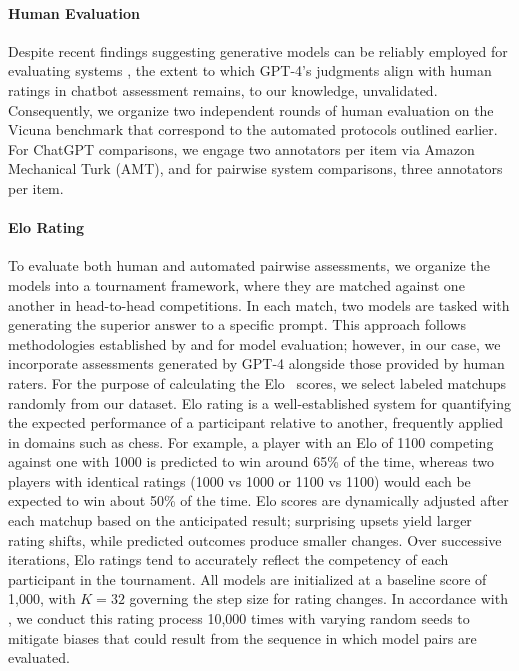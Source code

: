 \paragraph{Human Evaluation} Despite recent findings suggesting generative models can be reliably employed for evaluating systems \citep{fu2023gptscore}, the extent to which GPT-4’s judgments align with human ratings in chatbot assessment remains, to our knowledge, unvalidated. Consequently, we organize two independent rounds of human evaluation on the Vicuna benchmark that correspond to the automated protocols outlined earlier. For ChatGPT comparisons, we engage two annotators per item via Amazon Mechanical Turk (AMT), and for pairwise system comparisons, three annotators per item.

\paragraph{Elo Rating} To evaluate both human and automated pairwise assessments, we organize the models into a tournament framework, where they are matched against one another in head-to-head competitions. In each match, two models are tasked with generating the superior answer to a specific prompt. This approach follows methodologies established by \citet{bai2022training} and \citet{vicuna2023} for model evaluation; however, in our case, we incorporate assessments generated by GPT-4 alongside those provided by human raters. For the purpose of calculating the Elo~\citep{elo1967proposed,elo1978rating} scores, we select labeled matchups randomly from our dataset. Elo rating is a well-established system for quantifying the expected performance of a participant relative to another, frequently applied in domains such as chess. For example, a player with an Elo of 1100 competing against one with 1000 is predicted to win around 65\% of the time, whereas two players with identical ratings (1000 vs 1000 or 1100 vs 1100) would each be expected to win about 50\% of the time. Elo scores are dynamically adjusted after each matchup based on the anticipated result; surprising upsets yield larger rating shifts, while predicted outcomes produce smaller changes. Over successive iterations, Elo ratings tend to accurately reflect the competency of each participant in the tournament. All models are initialized at a baseline score of 1,000, with $K=32$ governing the step size for rating changes. In accordance with \citet{vicuna2023}, we conduct this rating process 10,000 times with varying random seeds to mitigate biases that could result from the sequence in which model pairs are evaluated.

